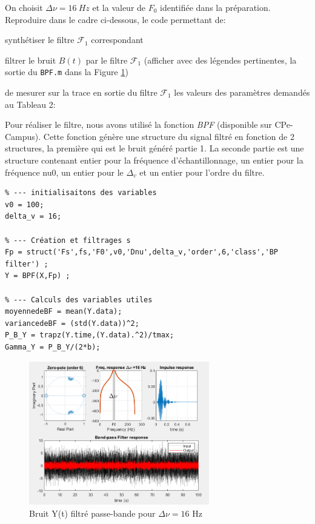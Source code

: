 \documentclass{article}
\newcommand{\dnu}{16}
\begin{document}
On choisit $\Delta\nu = \dnu~Hz$ et la valeur de $F_0$ identifiée dans la préparation.  \\
Reproduire dans le cadre ci-dessous, le code permettant de:
\begin{list}{-}{\setlength{\leftmargin}{3mm} \setlength{\labelwidth}{20mm} \setlength{\labelsep}{2mm} \setlength{\itemsep}{1mm} }
\item synthétiser le filtre $\mathcal{F}_1$ correspondant
\item filtrer le bruit $B(t)$ par le filtre $\mathcal{F}_1$ (afficher avec des légendes pertinentes, la sortie du {\tt BPF.m} dans la Figure \ref{fig-Y}) 
\item de mesurer sur la trace en sortie du filtre $\mathcal{F}_1$ les valeurs des paramètres demandés au Tableau 2:
\end{list}
\newline
Pour réaliser le filtre, nous avons utilisé la fonction \textit{BPF} (disponible sur CPe-Campus). Cette fonction génère une structure du signal filtré en fonction de 2 structures, la première qui est le bruit généré partie 1. La seconde partie est une structure contenant entier pour la fréquence d'échantillonnage, un entier pour la fréquence nu0, un entier pour le $\Delta_v$ et un entier pour l'ordre du filtre.  
\begin{verbatim}
% --- initialisaitons des variables
v0 = 100;
delta_v = 16;

% --- Création et filtrages s
Fp = struct('Fs',fs,'F0',v0,'Dnu',delta_v,'order',6,'class','BP filter') ;  
Y = BPF(X,Fp) ;

% --- Calculs des variables utiles
moyennedeBF = mean(Y.data);
variancedeBF = (std(Y.data))^2;
P_B_Y = trapz(Y.time,(Y.data).^2)/tmax;
Gamma_Y = P_B_Y/(2*b);
\end{verbatim}



\begin{figure}[h]
 \centerline{\includegraphics[width=0.7\textwidth]{images/filtreinit.png}}
 \caption{Bruit Y(t) filtré passe-bande pour $\Delta\nu = \dnu$ Hz}
 \label{fig-Y}
\end{figure}
\end{document}
